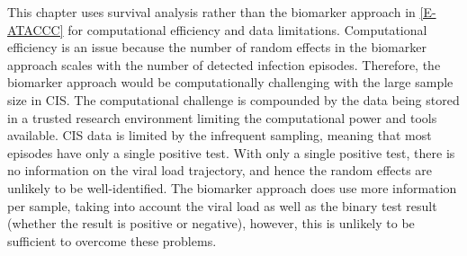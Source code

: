 \documentclass[thesis.tex]{subfiles}
\begin{document}
This chapter uses survival analysis rather than the biomarker approach in \autoref{E-ATACCC} for computational efficiency and data limitations.
Computational efficiency is an issue because the number of random effects in the biomarker approach scales with the number of detected infection episodes.
Therefore, the biomarker approach would be computationally challenging with the large sample size in CIS.
The computational challenge is compounded by the data being stored in a trusted research environment limiting the computational power and tools available.
CIS data is limited by the infrequent sampling, meaning that most episodes have only a single positive test.
With only a single positive test, there is no information on the viral load trajectory, and hence the random effects are unlikely to be well-identified.
The biomarker approach does use more information per sample, taking into account the viral load as well as the binary test result (\ie whether the result is positive or negative), however, this is unlikely to be sufficient to overcome these problems.
\end{document}
